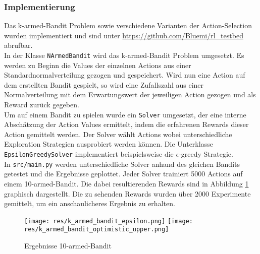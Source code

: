 \documentclass[11pt]{scrartcl}
\begin{document}
\subsubsection{Implementierung}
Das k-armed-Bandit Problem sowie verschiedene Varianten der Action-Selection wurden
implementiert und sind unter \url{https://github.com/Bluemi/rl_testbed} abrufbar.\\
In der Klasse \lstinline!NArmedBandit! wird das k-armed-Bandit Problem umgesetzt. Es
werden zu Beginn die Values der einzelnen Actions aus einer Standardnormalverteilung
gezogen und gespeichert. Wird nun eine Action auf dem erstellten Bandit gespielt, so wird
eine Zufallszahl aus einer Normalverteilung mit dem Erwartungswert der jeweiligen Action
gezogen und als Reward zurück gegeben.\\
Um auf einem Bandit zu spielen wurde ein \lstinline!Solver! umgesetzt, der eine interne
Abschät\-zung der Action Values ermittelt, indem die erfahrenen Rewards dieser Action
gemittelt werden. Der Solver wählt Actions wobei unterschiedliche Exploration Strategien
ausprobiert werden können. Die Unterklasse \lstinline!EpsilonGreedySolver! implementiert
beispielsweise die $\epsilon$-greedy Strategie.\\
In \lstinline!src/main.py! werden unterschiedliche Solver anhand des gleichen Bandits
getestet und die Ergebnisse geplottet. Jeder Solver trainiert 5000 Actions auf einem
10-armed-Bandit. Die dabei resultierenden Rewards sind in Abbildung
\ref{fig:karmed_bandit} graphisch dargestellt. Die zu sehenden Rewards wurden über 2000
Experimente gemittelt, um ein anschaulicheres Ergebnis zu erhalten.

\begin{figure}[htp]
\centering
\texttt{[image: res/k\_armed\_bandit\_epsilon.png]}
\texttt{[image: res/k\_armed\_bandit\_optimistic\_upper.png]}
\caption{Ergebnisse 10-armed-Bandit}
\label{fig:karmed_bandit}
\end{figure}
\end{document}
